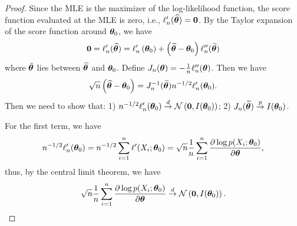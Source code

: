 \begin{proof}
	Since the MLE is the maximizer of the log-likelihood function, the score function evaluated at the MLE is zero, i.e., $\ell_{n}^{\prime}(\widehat{\boldsymbol{\theta}})=\mathbf{0}$. By the Taylor expansion of the score function around $\boldsymbol{\theta}_{0}$, we have
	\begin{equation*}
		\mathbf{0}=\ell_{n}^{\prime}(\widehat{\boldsymbol{\theta}})=\ell_{n}^{\prime}\left(\boldsymbol{\theta}_{0}\right)+\left(\widehat{\boldsymbol{\theta}}-\boldsymbol{\theta}_{0}\right)\ell_{n}^{\prime\prime}(\widetilde{\boldsymbol{\theta}})
	\end{equation*}
	where $\tilde{\boldsymbol{\theta}}$ lies between $\widehat{\boldsymbol{\theta}}$ and $\boldsymbol{\theta}_{0}$. Define $J_{n}(\boldsymbol{\theta})=-\frac{1}{n}\ell_{n}^{\prime\prime}(\boldsymbol{\theta})$. Then we have
	\begin{equation*}
		\sqrt{n}\left(\widehat{\boldsymbol{\theta}}-\boldsymbol{\theta}_{0}\right)=J_{n}^{-1}(\widetilde{\boldsymbol{\theta}})n^{-1/2}\ell_{n}^{\prime}(\boldsymbol{\theta}_{0}).
	\end{equation*}
	Then we need to show that: 1) $n^{-1/2}\ell_{n}^{\prime}(\boldsymbol{\theta}_{0})\stackrel{d}{\rightarrow}{\mathcal N}\left(\mathbf{0}, I(\boldsymbol{\theta}_{0})\right)$; 2) $J_{n}(\widetilde{\boldsymbol{\theta}})\stackrel{p}{\rightarrow}I(\boldsymbol{\theta}_{0})$.

	For the first term, we have
	\begin{equation*}
		n^{-1/2}\ell_{n}^{\prime}(\boldsymbol{\theta}_{0})=n^{-1/2}\sum_{i=1}^{n}\ell^{\prime}(X_{i};\boldsymbol{\theta}_{0})=\sqrt{n}\frac{1}{n}\sum_{i=1}^{n}\frac{\partial\log p(X_{i};\boldsymbol{\theta}_{0})}{\partial\boldsymbol{\theta}},
	\end{equation*}
	thus, by the central limit theorem, we have
	\begin{equation*}
		\sqrt{n}\frac{1}{n}\sum_{i=1}^{n}\frac{\partial\log p(X_{i};\boldsymbol{\theta}_{0})}{\partial\boldsymbol{\theta}}\stackrel{d}{\rightarrow}{\mathcal N}\left(\mathbf{0},I(\boldsymbol{\theta}_{0})\right).
	\end{equation*}


\end{proof}
